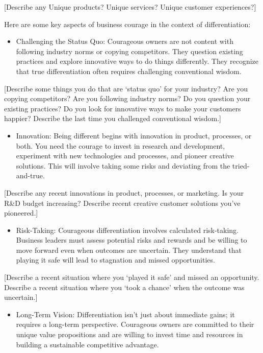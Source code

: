 \documentclass[
]{book}
\providecommand{\tightlist}{%
  \setlength{\itemsep}{0pt}\setlength{\parskip}{0pt}}
\begin{document}
{{[}Describe any Unique products? Unique services? Unique customer experiences?{]}}

Here are some key aspects of business courage in the context of differentiation:

\begin{itemize}
\tightlist
\item
  Challenging the Status Quo: Courageous owners are not content with following industry norms or copying competitors. They question existing practices and explore innovative ways to do things differently. They recognize that true differentiation often requires challenging conventional wisdom.
\end{itemize}

{{[}Describe some things you do that are `status quo' for your industry? Are you copying competitors? Are you following industry norms? Do you question your existing practices? Do you look for innovative ways to make your customers happier? Describe the last time you challenged conventional wisdom.{]}}

\begin{itemize}
\tightlist
\item
  Innovation: Being different begins with innovation in product, processes, or both. You need the courage to invest in research and development, experiment with new technologies and processes, and pioneer creative solutions. This will involve taking some risks and deviating from the tried-and-true.
\end{itemize}

{{[}Describe any recent innovations in product, processes, or marketing. Is your R\&D budget increasing? Describe recent creative customer solutions you've pioneered.{]}}

\begin{itemize}
\tightlist
\item
  Risk-Taking: Courageous differentiation involves calculated risk-taking. Business leaders must assess potential risks and rewards and be willing to move forward even when outcomes are uncertain. They understand that playing it safe will lead to stagnation and missed opportunities.
\end{itemize}

{{[}Describe a recent situation where you `played it safe' and missed an opportunity. Describe a recent situation where you `took a chance' when the outcome was uncertain.{]}}

\begin{itemize}
\tightlist
\item
  Long-Term Vision: Differentiation isn't just about immediate gains; it requires a long-term perspective. Courageous owners are committed to their unique value propositions and are willing to invest time and resources in building a sustainable competitive advantage.
\end{itemize}
\end{document}
